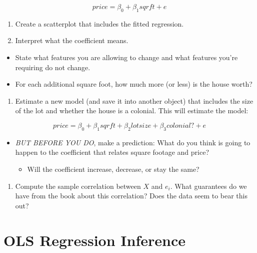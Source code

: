 \documentclass[
]{book}
\providecommand{\tightlist}{%
  \setlength{\itemsep}{0pt}\setlength{\parskip}{0pt}}
\theoremstyle{definition}
\theoremstyle{definition}
\theoremstyle{definition}
\theoremstyle{definition}
\theoremstyle{remark}
\begin{document}
\[ 
price = \beta_{0} + \beta_{1} sqrft + e
\]

\begin{enumerate}
\def\labelenumi{\arabic{enumi}.}
\setcounter{enumi}{4}
\item
  Create a scatterplot that includes the fitted regression.
\item
  Interpret what the coefficient means.
\end{enumerate}

\begin{itemize}
\tightlist
\item
  State what features you are allowing to change and what features you're requiring do not change.
\item
  For each additional square foot, how much more (or less) is the house worth?
\end{itemize}

\begin{enumerate}
\def\labelenumi{\arabic{enumi}.}
\setcounter{enumi}{6}
\tightlist
\item
  Estimate a new model (and save it into another object) that includes the size of the lot and whether the house is a colonial. This will estimate the model:
\end{enumerate}

\[ 
price = \beta_{0} + \beta_{1} sqrft + \beta_{2} lotsize + \beta_{3} colonial? + e
\]

\begin{itemize}
\tightlist
\item
  \emph{BUT BEFORE YOU DO}, make a prediction: What do you think is going to happen to the coefficient that relates square footage and price?

  \begin{itemize}
  \tightlist
  \item
    Will the coefficient increase, decrease, or stay the same?
  \end{itemize}
\end{itemize}

\begin{enumerate}
\def\labelenumi{\arabic{enumi}.}
\setcounter{enumi}{6}
\tightlist
\item
  Compute the sample correlation between \(X\) and \(e_i\). What guarantees do we have from the book about this correlation? Does the data seem to bear this out?
\end{enumerate}

\hypertarget{ols-regression-inference}{%
\chapter{OLS Regression Inference}\label{ols-regression-inference}}
\end{document}
